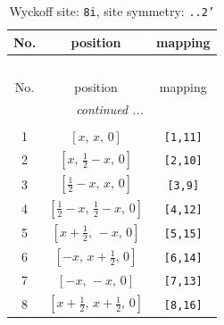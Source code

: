 \documentclass[fleqn,8pt]{jsarticle}
\begin{document}
\renewcommand{\arraystretch}{1.2}
\begin{longtable}{ccc}
\caption{Wyckoff site: {\tt 8i}, site symmetry: {\tt ..2'}}
 \\
 \hline \hline
No. & position & mapping \\ \hline \endfirsthead

\multicolumn{2}{l}{\tablename\ \thetable{}} \\
 \hline \hline
No. & position & mapping \\ \hline \endhead

 \hline \hline
\multicolumn{2}{r}{\footnotesize\it continued ...} \\ \endfoot

 \hline \hline
\multicolumn{2}{r}{} \\ \endlastfoot

1 & $\left[ x,\, x,\, 0 \right]$ & {\tt [1,11]} \\ \hline
2 & $\left[ x,\, \frac{1}{2} - x,\, 0 \right]$ & {\tt [2,10]} \\ \hline
3 & $\left[ \frac{1}{2} - x,\, x,\, 0 \right]$ & {\tt [3,9]} \\ \hline
4 & $\left[ \frac{1}{2} - x,\, \frac{1}{2} - x,\, 0 \right]$ & {\tt [4,12]} \\ \hline
5 & $\left[ x + \frac{1}{2},\, - x,\, 0 \right]$ & {\tt [5,15]} \\ \hline
6 & $\left[ - x,\, x + \frac{1}{2},\, 0 \right]$ & {\tt [6,14]} \\ \hline
7 & $\left[ - x,\, - x,\, 0 \right]$ & {\tt [7,13]} \\ \hline
8 & $\left[ x + \frac{1}{2},\, x + \frac{1}{2},\, 0 \right]$ & {\tt [8,16]} \\
\end{longtable}
\renewcommand{\arraystretch}{1.2}
\end{document}
